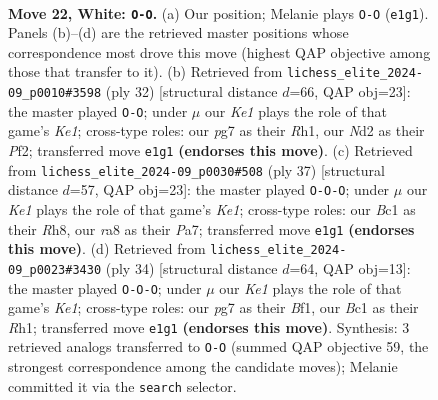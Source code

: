\documentclass[11pt]{article}
\begin{document}
\clearpage

\begin{figure}[p]\centering
\begin{subfigure}{0.46\textwidth}\centering
\resizebox{\linewidth}{!}{%
\newchessgame
\chessboard[
  setfen={rnb1kr2/pp2b1pp/8/3pPp1P/8/P5P1/3NN3/R1B1K2R w KQ - 1 22},
  showmover=false,
  pgfstyle=straightmove, color=movearrow, markmove={e1-g1}
]}
\caption{}
\end{subfigure}\hfill
\begin{subfigure}{0.46\textwidth}\centering
\resizebox{\linewidth}{!}{%
\newchessgame
\chessboard[
  setfen={2kr1b1r/5ppp/p3b3/np2p3/8/2P1N3/PP2BPPP/R1B1K2R w KQ - 4 17},
  showmover=false,
  pgfstyle=straightmove, color=movearrow, markmove={e1-g1}
]}
\caption{}
\end{subfigure}
\\[4pt]
\begin{subfigure}{0.46\textwidth}\centering
\resizebox{\linewidth}{!}{%
\newchessgame
\chessboard[
  setfen={r3k2r/pp3bpp/2nB1p2/3p1P2/6P1/2P5/P1P1B2P/2KRR3 b kq - 2 19},
  showmover=false,
  pgfstyle=straightmove, color=movearrow, markmove={e8-c8}
]}
\caption{}
\end{subfigure}\hfill
\begin{subfigure}{0.46\textwidth}\centering
\resizebox{\linewidth}{!}{%
\newchessgame
\chessboard[
  setfen={r6r/pb1nk1pp/1p2p3/3pP2P/8/5N2/PPP3P1/R3KB1R w KQ - 1 18},
  showmover=false,
  pgfstyle=straightmove, color=movearrow, markmove={e1-c1}
]}
\caption{}
\end{subfigure}
\caption{\textbf{Move 22, White: \texttt{O-O}.} (a) Our position; Melanie plays \texttt{O-O} (\texttt{e1g1}). Panels (b)--(d) are the retrieved master positions whose correspondence most drove this move (highest QAP objective among those that transfer to it). (b) Retrieved from \texttt{lichess\_elite\_2024-09\_p0010\#3598} (ply 32) [structural distance $d$=66, QAP obj=23]: the master played \texttt{O-O}; under $\mu$ our \emph{Ke1} plays the role of that game's \emph{Ke1}; cross-type roles: our \emph{p}g7 as their \emph{R}h1, our \emph{N}d2 as their \emph{P}f2; transferred move \texttt{e1g1} \textbf{(endorses this move)}. (c) Retrieved from \texttt{lichess\_elite\_2024-09\_p0030\#508} (ply 37) [structural distance $d$=57, QAP obj=23]: the master played \texttt{O-O-O}; under $\mu$ our \emph{Ke1} plays the role of that game's \emph{Ke1}; cross-type roles: our \emph{B}c1 as their \emph{R}h8, our \emph{r}a8 as their \emph{P}a7; transferred move \texttt{e1g1} \textbf{(endorses this move)}. (d) Retrieved from \texttt{lichess\_elite\_2024-09\_p0023\#3430} (ply 34) [structural distance $d$=64, QAP obj=13]: the master played \texttt{O-O-O}; under $\mu$ our \emph{Ke1} plays the role of that game's \emph{Ke1}; cross-type roles: our \emph{p}g7 as their \emph{B}f1, our \emph{B}c1 as their \emph{R}h1; transferred move \texttt{e1g1} \textbf{(endorses this move)}. Synthesis: 3 retrieved analogs transferred to \texttt{O-O} (summed QAP objective 59, the strongest correspondence among the candidate moves); Melanie committed it via the \texttt{search} selector.}
\label{fig:thought-m42}
\end{figure}
\end{document}
